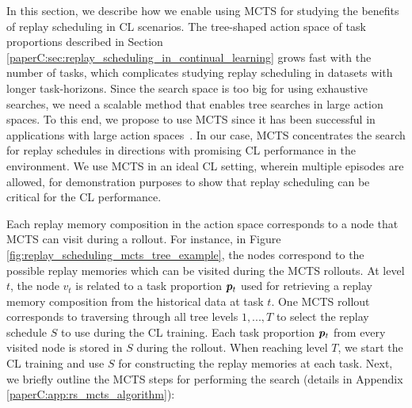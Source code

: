 In this section, we describe how we enable using MCTS for studying the benefits of replay scheduling in CL scenarios.
The tree-shaped action space of task proportions described in Section \ref{paperC:sec:replay_scheduling_in_continual_learning} grows fast with the number of tasks, which complicates studying replay scheduling in datasets with longer task-horizons. Since the search space is too big for using exhaustive searches, 
we need a scalable method that enables tree searches in large action spaces.
To this end, we propose to use MCTS since it has been successful in applications with large action spaces~. In our case, MCTS concentrates the search for replay schedules in directions with promising CL performance in the environment. We use MCTS in an ideal CL setting, wherein multiple episodes are allowed, for demonstration purposes to show that replay scheduling can be critical for the CL performance. 

Each replay memory composition in the action space corresponds to a node that MCTS can visit during a rollout. For instance, in Figure \ref{fig:replay_scheduling_mcts_tree_example}, the nodes correspond to the possible replay memories which can be visited during the MCTS rollouts. 
At level $t$, the node $v_t$ is related to a task proportion ${\bm{p}}_{t}$ used for retrieving a replay memory composition from the historical data at task $t$. One MCTS rollout corresponds to traversing through all tree levels $1, ..., T$ to select the replay schedule $S$ to use during the CL training. Each task proportion ${\bm{p}}_t$ from every visited node is stored in $S$ during the rollout. When reaching level $T$, we start the CL training and use $S$ for constructing the replay memories at each task. Next, we briefly outline the MCTS steps for performing the search (details in Appendix \ref{paperC:app:rs_mcts_algorithm}):


